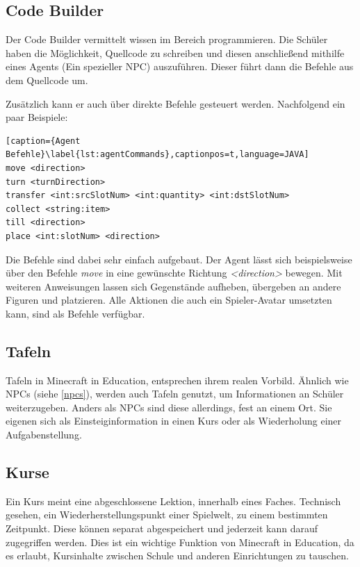 \subsection{Code Builder}
Der Code Builder vermittelt wissen im Bereich programmieren. Die Schüler haben die Möglichkeit, Quellcode zu schreiben und diesen anschließend mithilfe eines Agents (Ein spezieller NPC) auszuführen.
Dieser führt dann die Befehle aus dem Quellcode um. 

Zusätzlich kann er auch über direkte Befehle gesteuert werden. Nachfolgend ein paar Beispiele:

\begin{lstlisting}[caption={Agent Befehle}\label{lst:agentCommands},captionpos=t,language=JAVA]
move <direction>
turn <turnDirection>
transfer <int:srcSlotNum> <int:quantity> <int:dstSlotNum>
collect <string:item>
till <direction>
place <int:slotNum> <direction>
\end{lstlisting}

Die Befehle sind dabei sehr einfach aufgebaut. Der Agent lässt sich beispielsweise über den Befehle \textit{move} in eine gewünschte Richtung \textit{<direction>} bewegen. Mit weiteren Anweisungen lassen sich Gegenstände aufheben, übergeben an andere Figuren und platzieren. Alle Aktionen die auch ein Spieler-Avatar umsetzten kann, sind als Befehle verfügbar. 

\subsection{Tafeln}

Tafeln in Minecraft in Education, entsprechen ihrem realen Vorbild. Ähnlich wie NPCs (siehe \ref{npcs}), werden auch Tafeln genutzt, um Informationen an Schüler weiterzugeben.
Anders als NPCs sind diese allerdings, fest an einem Ort. Sie eigenen sich als Einsteiginformation in einen Kurs oder als Wiederholung einer Aufgabenstellung.

\subsection{Kurse}

Ein Kurs meint eine abgeschlossene Lektion, innerhalb eines Faches. Technisch gesehen, ein Wiederherstellungspunkt einer Spielwelt, zu einem bestimmten Zeitpunkt. Diese können separat abgespeichert und jederzeit kann darauf zugegriffen werden. Dies ist ein wichtige Funktion von Minecraft in Education, da es erlaubt, Kursinhalte zwischen Schule und anderen Einrichtungen zu tauschen.

